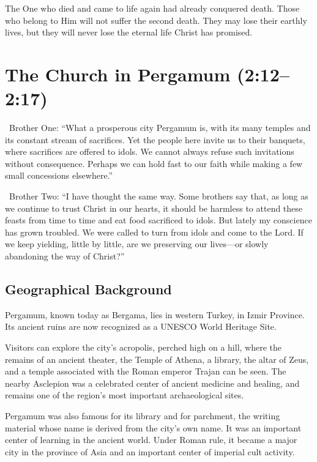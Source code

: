The One who died and came to life again had already conquered death. Those who belong to Him will not suffer the second death. They may lose their earthly lives, but they will never lose the eternal life Christ has promised.

\section{The Church in Pergamum (2:12--2:17)}

\begin{DialogueBox}
\noindent\faUser\ Brother One: ``What a prosperous city Pergamum is, with its many temples and its constant stream of sacrifices. Yet the people here invite us to their banquets, where sacrifices are offered to idols. We cannot always refuse such invitations without consequence. Perhaps we can hold fast to our faith while making a few small concessions elsewhere.''

\vspace{0.1cm}

\noindent\faUser\ Brother Two: ``I have thought the same way. Some brothers say that, as long as we continue to trust Christ in our hearts, it should be harmless to attend these feasts from time to time and eat food sacrificed to idols. But lately my conscience has grown troubled. We were called to turn from idols and come to the Lord. If we keep yielding, little by little, are we preserving our lives—or slowly abandoning the way of Christ?''
\end{DialogueBox}

\subsection{Geographical Background}

Pergamum, known today as Bergama, lies in western Turkey, in Izmir Province. Its ancient ruins are now recognized as a UNESCO World Heritage Site.

Visitors can explore the city's acropolis, perched high on a hill, where the remains of an ancient theater, the Temple of Athena, a library, the altar of Zeus, and a temple associated with the Roman emperor Trajan can be seen. The nearby Asclepion was a celebrated center of ancient medicine and healing, and remains one of the region's most important archaeological sites.

Pergamum was also famous for its library and for parchment, the writing material whose name is derived from the city's own name. It was an important center of learning in the ancient world. Under Roman rule, it became a major city in the province of Asia and an important center of imperial cult activity.


